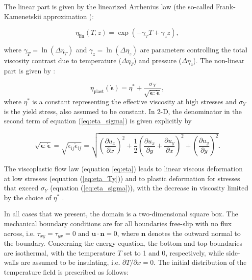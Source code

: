 The linear part is given by the linearized Arrhenius law (the so-called Frank-Kamenetskii approximation \cite{fran69}):

\begin{equation}
\eta_\text{lin} (T,z) = \exp(-\gamma_T T + \gamma_{z} z), \label{eq:eta_Ty}
\end{equation}

where $\gamma_T = \ln ( \Delta\eta_T)$ and $\gamma_{z}=\ln(\Delta\eta_{z})$ are parameters controlling the total viscosity 
contrast due to temperature ($\Delta\eta_T$) and pressure ($\Delta\eta_{z}$). The non-linear part is given by \cite{trha98,trha98b}: 

\begin{equation}
\eta_\text{plast} (\dot{\boldsymbol{\epsilon}}) 
= \eta^{*} + \frac{\sigma_Y}{\sqrt{\dot{\boldsymbol{\epsilon}}:\dot{\boldsymbol{\epsilon}}}}, \label{eq:eta_sigma}
\end{equation}
where $\eta^*$ is a constant representing the effective viscosity at high stresses \cite{stlh14} and $\sigma_Y$ is the yield stress, also assumed to be constant. In 2-D, the denominator in the second term of 
equation (\ref{eq:eta_sigma}) is given explicitly by

\begin{equation}
\sqrt{\dot{\boldsymbol{\epsilon}}:\dot{\boldsymbol{\epsilon}}} 
= \sqrt{\dot{\epsilon}_{ij} \dot{\epsilon}_{ij} } 
= \sqrt{\left( \frac{\partial u_x}{\partial x} \right)^2 + \frac{1}{2} \left( \frac{\partial u_x}{\partial y} 
+ \frac{\partial u_y}{\partial x} \right)^2 + \left( \frac{\partial u_y}{\partial y} \right)^2  }.
\end{equation}

The viscoplastic flow law (equation \ref{eq:eta}) leads to linear viscous 
deformation at low stresses (equation (\ref{eq:eta_Ty})) 
and to plastic deformation for stresses that exceed $\sigma_Y$ (equation (\ref{eq:eta_sigma})), 
with the decrease in viscosity limited by the choice of $\eta^{*}$ \cite{stlh14}.

In all cases that we present, the domain is a two-dimensional square box. The mechanical 
boundary conditions are for all boundaries free-slip 
with no flux across, i.e. $\tau_{xy}=\tau_{yx}=0$ and $\boldsymbol{u}\cdot \boldsymbol{n}=0$, 
where $\boldsymbol{n}$ denotes the outward normal to 
the boundary. Concerning the energy equation, the bottom and top boundaries are isothermal, 
with the temperature $T$ set to 1 and 0, respectively, 
while side-walls are assumed to be insulating, i.e. $\partial T/\partial x = 0$. 
The initial distribution of the temperature field is prescribed as follows:


